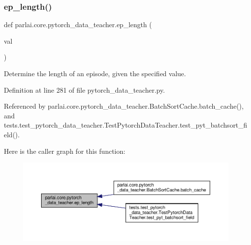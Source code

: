 \subsubsection{\texorpdfstring{ep\+\_\+length()}{ep\_length()}}
{\footnotesize\ttfamily def parlai.\+core.\+pytorch\+\_\+data\+\_\+teacher.\+ep\+\_\+length (\begin{DoxyParamCaption}\item[{}]{val }\end{DoxyParamCaption})}

\begin{DoxyVerb}Determine the length of an episode, given the specified value.\end{DoxyVerb}
 

Definition at line 281 of file pytorch\+\_\+data\+\_\+teacher.\+py.



Referenced by parlai.\+core.\+pytorch\+\_\+data\+\_\+teacher.\+Batch\+Sort\+Cache.\+batch\+\_\+cache(), and tests.\+test\+\_\+pytorch\+\_\+data\+\_\+teacher.\+Test\+Pytorch\+Data\+Teacher.\+test\+\_\+pyt\+\_\+batchsort\+\_\+field().

Here is the caller graph for this function\+:
\nopagebreak
\begin{figure}[H]
\begin{center}
\leavevmode
\includegraphics[width=350pt]{namespaceparlai_1_1core_1_1pytorch__data__teacher_afbd22acd239efcdb6afb94db83ee3493_icgraph}
\end{center}
\end{figure}
\mbox{\label{namespaceparlai_1_1core_1_1pytorch__data__teacher_acd56d9ac5d68831c1e91690f26eb2328}} 
